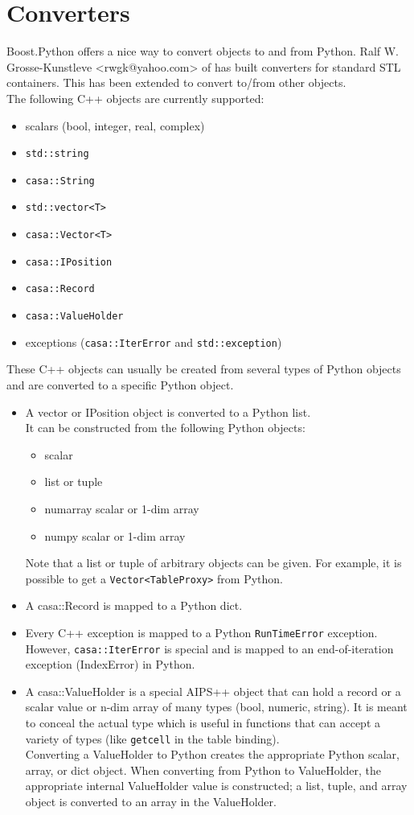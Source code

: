 \section{Converters}
Boost.Python offers a nice way to convert objects to and from Python.
Ralf W. Grosse-Kunstleve <rwgk@yahoo.com> of
has built converters for standard STL containers. This has been
extended to convert to/from other objects.
\\The following C++ objects are currently supported:
\begin{itemize}
  \item scalars (bool, integer, real, complex)
  \item \texttt{std::string}
  \item \texttt{casa::String}
  \item \texttt{std::vector<T>}
  \item \texttt{casa::Vector<T>}
  \item \texttt{casa::IPosition}
  \item \texttt{casa::Record}
  \item \texttt{casa::ValueHolder}
  \item exceptions (\texttt{casa::IterError} and \texttt{std::exception})
\end{itemize}
These C++ objects can usually be created from several types of Python
objects and are converted to a specific Python object.
\begin{itemize}
\item
A vector or IPosition object is converted to a Python list.
\\It can be constructed from the following Python objects:
\begin{itemize}
  \item scalar
  \item list or tuple
  \item numarray scalar or 1-dim array
  \item numpy scalar or 1-dim array
\end{itemize}
Note that a list or tuple of arbitrary objects can be given. For
example, it is possible to get a \texttt{Vector<TableProxy>} from Python.
\item
A casa::Record is mapped to a Python dict.
\item
Every C++ exception is mapped to a Python \texttt{RunTimeError}
exception. However, \texttt{casa::IterError} is special and 
is mapped to an end-of-iteration exception (IndexError) in Python.
\item
A casa::ValueHolder is a special AIPS++ object that can hold a record or
a scalar value or n-dim array of many types (bool, numeric, string).
It is meant to conceal the actual type which is useful in functions
that can accept a variety of types (like \texttt{getcell}
in the table binding).
\\Converting a ValueHolder to Python creates the appropriate Python
scalar, array, or dict object. When converting from
Python to ValueHolder, the appropriate internal ValueHolder value
is constructed; a list, tuple, and array object is converted to an array
in the ValueHolder.
\end{itemize}
